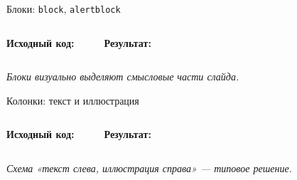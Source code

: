 \begin{frame}[fragile,label=blocks]{Блоки: \texttt{block}, \texttt{alertblock}}
  \begin{columns}[T,onlytextwidth]
      \textbf{Исходный код:}
      \vspace{0.2em}
      \inputminted[fontsize=\scriptsize, frame=single, breaklines=true]{latex}{examples/blocks.tex}

      \textbf{Результат:}
      \vspace{0.2em}
       
  \end{columns}

  \vspace{0.4em}
  \centering
  \emph{Блоки визуально выделяют смысловые части слайда.}
\end{frame}

\begin{frame}[fragile,label=columns]{Колонки: текст и иллюстрация}
  \begin{columns}[T,onlytextwidth]
      \textbf{Исходный код:}
      \vspace{0.2em}
      \inputminted[fontsize=\scriptsize, frame=single, breaklines=true]{latex}{examples/columns.tex}

      \textbf{Результат:}
      \vspace{0.2em}
      
  \end{columns}

  \vspace{0.4em}
  \centering
  \emph{Схема «текст слева, иллюстрация справа» --- типовое решение.}
\end{frame}
